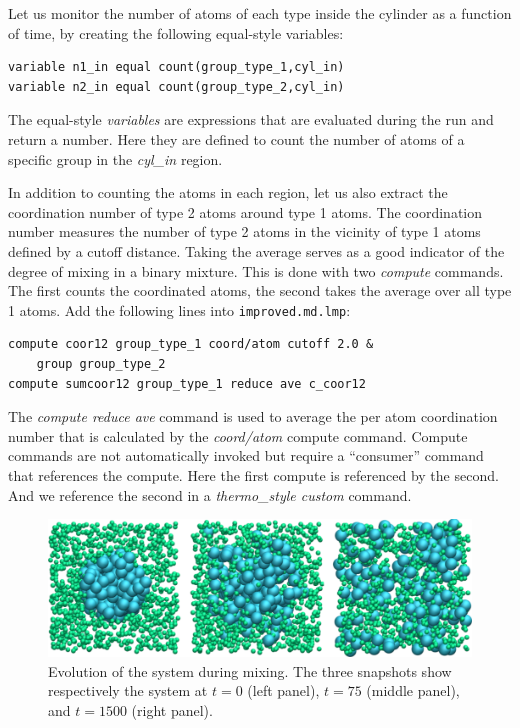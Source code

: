 \documentclass[9pt,tutorial]{livecoms}
\newcommand{\flecmd}[1]{\textcolor{command}{\texttt{#1}}} %
\begin{document}
Let us monitor the number of atoms of each type inside the cylinder as a
function of time, by creating the following equal-style variables:
\begin{lstlisting}
variable n1_in equal count(group_type_1,cyl_in)
variable n2_in equal count(group_type_2,cyl_in)
\end{lstlisting}
The equal-style \textit{variables} are expressions that are evaluated
during the run and return a number.  Here they are defined to count
the number of atoms of a specific group in the \textit{cyl\_in} region.

In addition to counting the atoms in each region, let us also extract
the coordination number of type 2 atoms around type 1 atoms.  The
coordination number measures the number of type 2 atoms in the vicinity
of type 1 atoms defined by a cutoff distance.  Taking the average serves
as a good indicator of the degree of mixing in a binary mixture.  This
is done with two \textit{compute} commands.  The first counts the
coordinated atoms, the second takes the average over all type 1
atoms. Add the following lines into \flecmd{improved.md.lmp}:
\begin{lstlisting}
compute coor12 group_type_1 coord/atom cutoff 2.0 &
    group group_type_2
compute sumcoor12 group_type_1 reduce ave c_coor12
\end{lstlisting}
The \textit{compute reduce ave} command is used to average the per atom
coordination number that is calculated by the \textit{coord/atom}
compute command.  Compute commands are not automatically invoked but
require a ``consumer'' command that references the compute.  Here the
first compute is referenced by the second.  And we reference the second
in a \textit{thermo\_style custom} command.

\begin{figure}
\centering
\includegraphics[width=\linewidth]{LJ-evolution}
\caption{Evolution of the system during mixing. The three snapshots show
respectively the system at $t=0$ (left panel), $t=75$ (middle panel), and $t=1500$
(right panel).}
\label{fig:evolution-population}
\end{figure}
\end{document}
